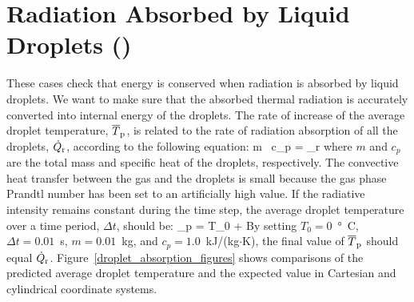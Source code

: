 \documentclass[11pt]{book}
\begin{document}
\clearpage

\section{Radiation Absorbed by Liquid Droplets (\texorpdfstring{}{droplet\_absorption}) }
\label{droplet_absorption}

These cases check that energy is conserved when radiation is absorbed by liquid droplets. We want to make sure that the absorbed thermal radiation is accurately converted into internal energy of the droplets. The rate of increase of the average droplet temperature, $\overline{T}_{\rm p}$, is related to the rate of radiation absorption of all the droplets, $\dot{Q}_{\rm r}$, according to the following equation:
\be
m \, c_p  = _{\rm r}
\ee
where $m$ and $c_p$ are the total mass and specific heat of the droplets, respectively. The convective heat transfer between the gas and the droplets is small because the gas phase Prandtl number has been set to an artificially high value. If the radiative intensity remains constant during the time step, the average droplet temperature over a time period, $\Delta t$, should be:
\be
{}_{\rm p} = T_0 + 
\ee
By setting $T_0=0$~\si{\degree C}, $\Delta t =0.01$~s, $m =0.01$~kg, and $c_p =1.0$~kJ/(kg$\cdot$K), the final value of $\overline{T}_{\rm p}$ should equal $\dot{Q}_{\rm r}$. Figure~\ref{droplet_absorption_figures} shows comparisons of the predicted average droplet temperature and the expected value in Cartesian and cylindrical coordinate systems.
\end{document}
